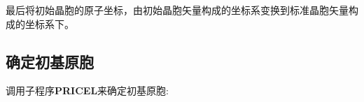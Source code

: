\documentclass{article}      %
\begin{document}
最后将初始晶胞的原子坐标，由初始晶胞矢量构成的坐标系变换到标准晶胞矢量构成的坐标系下。

\subsection{确定初基原胞}
调用子程序\textbf{PRICEL}来确定初基原胞:~\\
\end{document}
